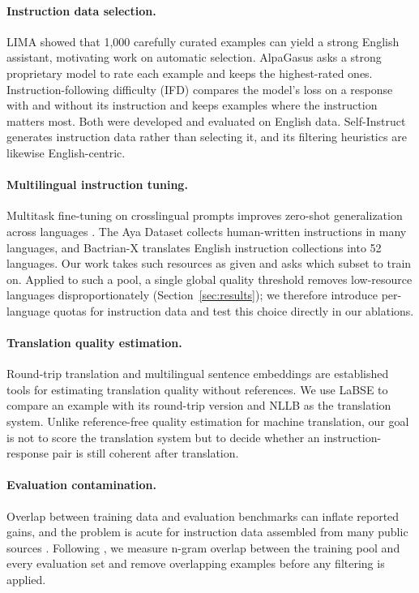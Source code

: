 \documentclass{article}
\begin{document}
\paragraph{Instruction data selection.}
LIMA \citep{zhou2023lima} showed that 1,000 carefully curated examples can yield a strong English assistant, motivating work on automatic selection. AlpaGasus \citep{chen2024alpagasus} asks a strong proprietary model to rate each example and keeps the highest-rated ones. Instruction-following difficulty (IFD) \citep{li2024ifd} compares the model's loss on a response with and without its instruction and keeps examples where the instruction matters most. Both were developed and evaluated on English data. Self-Instruct \citep{wang2023selfinstruct} generates instruction data rather than selecting it, and its filtering heuristics are likewise English-centric.

\paragraph{Multilingual instruction tuning.}
Multitask fine-tuning on crosslingual prompts improves zero-shot generalization across languages \citep{muennighoff2023crosslingual}. The Aya Dataset \citep{singh2024aya} collects human-written instructions in many languages, and Bactrian-X \citep{li2023bactrianx} translates English instruction collections into 52 languages. Our work takes such resources as given and asks which subset to train on. Applied to such a pool, a single global quality threshold removes low-resource languages disproportionately (Section~\ref{sec:results}); we therefore introduce per-language quotas for instruction data and test this choice directly in our ablations.

\paragraph{Translation quality estimation.}
Round-trip translation and multilingual sentence embeddings are established tools for estimating translation quality without references. We use LaBSE \citep{feng2022labse} to compare an example with its round-trip version and NLLB \citep{nllb2022} as the translation system. Unlike reference-free quality estimation for machine translation, our goal is not to score the translation system but to decide whether an instruction-response pair is still coherent after translation.

\paragraph{Evaluation contamination.}
Overlap between training data and evaluation benchmarks can inflate reported gains, and the problem is acute for instruction data assembled from many public sources \citep{sainz2023contamination}. Following \citet{brown2020gpt3}, we measure n-gram overlap between the training pool and every evaluation set and remove overlapping examples before any filtering is applied.
\end{document}
